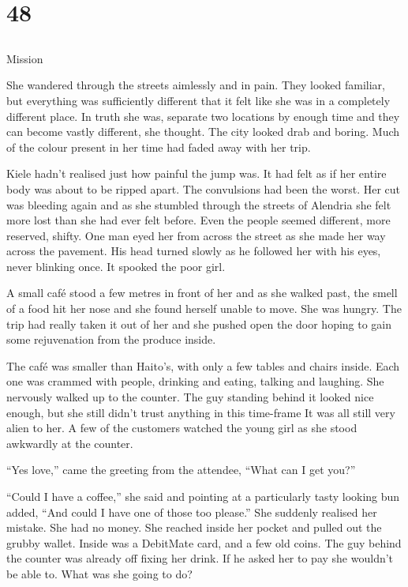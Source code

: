 \chapter{48}
\section{}
Mission  

She wandered through the streets aimlessly and in pain.  They looked familiar, but everything was sufficiently different that it felt like she was in a completely different place.  In truth she was, separate two locations by enough time and they can become vastly different, she thought.  The city looked drab and boring.  Much of the colour present in her time had faded away with her trip.  

Kiele hadn't realised just how painful the jump was.  It had felt as if her entire body was about to be ripped apart.  The convulsions had been the worst.  Her cut was bleeding again and as she stumbled through the streets of Alendria she felt more lost than she had ever felt before.  Even the people seemed different, more reserved, shifty.  One man eyed her from across the street as she made her way across the pavement.  His head turned slowly as he followed her with his eyes, never blinking once.  It spooked the poor girl.

A small café stood a few metres in front of her and as she walked past, the smell of a food hit her nose and she found herself unable to move.  She was hungry.  The trip had really taken it out of her and she pushed open the door hoping to gain some rejuvenation from the produce inside.

The café was smaller than Haito's, with only a few tables and chairs inside.  Each one was crammed with people, drinking and eating, talking and laughing.  She nervously walked up to the counter.  The guy standing behind it looked nice enough, but she still didn't trust anything in this time-frame  It was all still very alien to her.  A few of the customers watched the young girl as she stood awkwardly at the counter.  

``Yes love,'' came the greeting from the attendee, ``What can I get you?''

``Could I have a coffee,'' she said and pointing at a particularly tasty looking bun added, ``And could I have one of those too please.''  She suddenly realised her mistake.  She had no money.  She reached inside her pocket and pulled out the grubby wallet.  Inside was a DebitMate card, and a few old coins.  The guy behind the counter was already off fixing her drink.  If he asked her to pay she wouldn't be able to.  What was she going to do?

